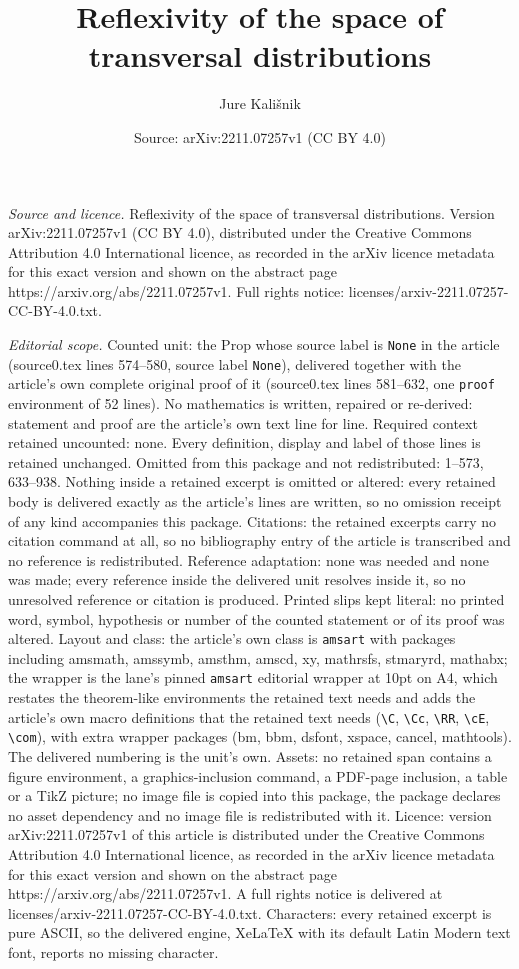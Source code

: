 \documentclass[10pt,a4paper]{amsart}
\title[Reflexivity of the space of transversal distributions]{Reflexivity of the space of transversal distributions}
\author{Jure Kali\v{s}nik}
\date{Source: arXiv:2211.07257v1 (CC BY 4.0)}
\begin{document}
\maketitle

\noindent\emph{Source and licence.} Reflexivity of the space of transversal distributions. Version arXiv:2211.07257v1 (CC BY 4.0), distributed under the Creative Commons Attribution 4.0 International licence, as recorded in the arXiv licence metadata for this exact version and shown on the abstract page https://arxiv.org/abs/2211.07257v1. Full rights notice: licenses/arxiv-2211.07257-CC-BY-4.0.txt.\par\smallskip

\noindent\textit{Editorial scope.} Counted unit: the Prop whose source label is \texttt{None} in the article (source0.tex lines 574--580, source label \texttt{None}), delivered together with the article's own complete original proof of it (source0.tex lines 581--632, one \texttt{proof} environment of 52 lines). No mathematics is written, repaired or re-derived: statement and proof are the article's own text line for line. Required context retained uncounted: none. Every definition, display and label of those lines is retained unchanged. Omitted from this package and not redistributed: 1--573, 633--938. Nothing inside a retained excerpt is omitted or altered: every retained body is delivered exactly as the article's lines are written, so no omission receipt of any kind accompanies this package. Citations: the retained excerpts carry no citation command at all, so no bibliography entry of the article is transcribed and no reference is redistributed. Reference adaptation: none was needed and none was made; every reference inside the delivered unit resolves inside it, so no unresolved reference or citation is produced. Printed slips kept literal: no printed word, symbol, hypothesis or number of the counted statement or of its proof was altered. Layout and class: the article's own class is \texttt{amsart} with packages including amsmath, amssymb, amsthm, amscd, xy, mathrsfs, stmaryrd, mathabx; the wrapper is the lane's pinned \texttt{amsart} editorial wrapper at 10pt on A4, which restates the theorem-like environments the retained text needs and adds the article's own macro definitions that the retained text needs (\texttt{\textbackslash C}, \texttt{\textbackslash Cc}, \texttt{\textbackslash RR}, \texttt{\textbackslash cE}, \texttt{\textbackslash com}), with extra wrapper packages (bm, bbm, dsfont, xspace, cancel, mathtools). The delivered numbering is the unit's own. Assets: no retained span contains a figure environment, a graphics-inclusion command, a PDF-page inclusion, a table or a TikZ picture; no image file is copied into this package, the package declares no asset dependency and no image file is redistributed with it. Licence: version arXiv:2211.07257v1 of this article is distributed under the Creative Commons Attribution 4.0 International licence, as recorded in the arXiv licence metadata for this exact version and shown on the abstract page https://arxiv.org/abs/2211.07257v1. A full rights notice is delivered at licenses/arxiv-2211.07257-CC-BY-4.0.txt. Characters: every retained excerpt is pure ASCII, so the delivered engine, XeLaTeX with its default Latin Modern text font, reports no missing character.
\end{document}
